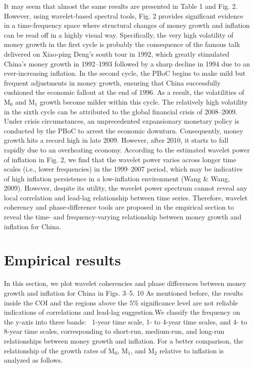 \documentclass[a4paper,fleqn]{cas-sc}
\begin{document}
It may seem that almost the same results are presented in Table 1 and Fig. 2. However, using wavelet-based spectral tools, Fig. 2 provides significant evidence in a time-frequency space where structural changes of money growth and inflation can be read off in a highly visual way. Specifically, the very high volatility of money growth in the first cycle is probably the consequence of the famous talk delivered on Xiao-ping Deng's south tour in 1992, which greatly stimulated China's money growth in 1992–1993 followed by a sharp decline in 1994 due to an ever-increasing inflation. In the second cycle, the PBoC begins to make mild but frequent adjustments in money growth, ensuring that China successfully cushioned the economic fallout at the end of 1996. As a result, the volatilities of M$_0$ and M$_1$ growth become milder within this cycle. The relatively high volatility in the sixth cycle can be attributed to the global financial crisis of 2008–2009. Under crisis circumstances, an unprecedented expansionary monetary policy is conducted by the PBoC to arrest the economic downturn. Consequently, money growth hits a record high in late 2009. However, after 2010, it starts to fall rapidly due to an overheating economy. According to the estimated wavelet power of inflation in Fig. 2, we find that the wavelet power varies across longer time scales (i.e., lower frequencies) in the 1999–2007 period, which may be indicative of high inflation persistence in a low-inflation environment (Wang \& Wang, 2009). However, despite its utility, the wavelet power spectrum cannot reveal any local correlation and lead-lag relationship between time series. Therefore, wavelet coherency and phase-difference tools are proposed in the empirical section to reveal the time- and frequency-varying relationship between money growth and inflation for China.

\section{Empirical results}\label{sec:5}
In this section, we plot wavelet coherencies and phase differences between money growth and inflation for China in Figs. 3–5. 10 As mentioned before, the results inside the COI and the regions above the $5\%$ significance level are not reliable indications of correlations and lead-lag suggestion.We classify the frequency on the y-axis into three bands: ~1-year time scale, 1- to 4-year time scales, and 4- to 8-year time scales, corresponding to short-run, medium-run, and long-run relationships between money growth and inflation. For a better comparison, the relationship of the growth rates of M$_0$, M$_1$, and M$_2$ relative to inflation is analyzed as follows.
\end{document}
